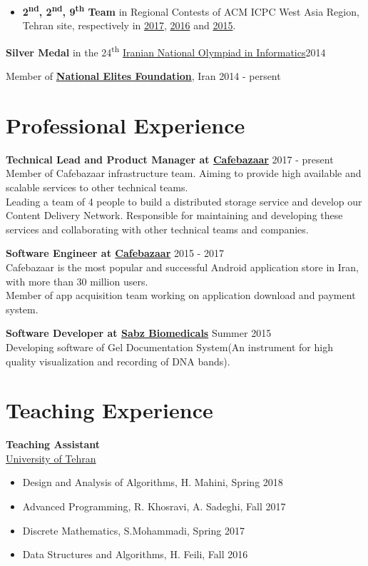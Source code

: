 \documentclass[margin]{res}
\begin{document}
\begin{resume}
\begin{itemize}
	\item {\bf 2\textsuperscript{nd}, 2\textsuperscript{nd}, 9\textsuperscript{th} Team} in Regional Contests of ACM ICPC West Asia Region,
	Tehran site, respectively in 
	\href{http://icpc.sharif.edu/acmicpc17/scoreboard/}{2017}, 
	\href{http://icpc.sharif.edu/acmicpc16/scoreboard/}{2016} and 
	\href{http://icpc.sharif.edu/acmicpc15/scoreboard/}{2015}.

    \end{itemize}

    {\bf Silver Medal} in the 24\textsuperscript{th} \href{http://inoi.ir/}{Iranian National Olympiad in Informatics}\hfill 2014

    Member of \href{https://www.bmn.ir/}{{\bf National Elites Foundation}}, Iran \hfill 2014 - persent

\section{Professional Experience}
    {\bf Technical Lead and Product Manager at \href{https://cafebazaar.ir/}{Cafebazaar}} \hfill 2017 - present
    \\ Member of Cafebazaar infrastructure team. Aiming to provide high available and scalable services to other technical teams. 
    \\Leading a team of 4 people to build a distributed storage service and develop our Content Delivery Network. Responsible for maintaining and developing these services and collaborating with other technical teams and companies.
    
    {\bf Software Engineer at \href{https://cafebazaar.ir/}{Cafebazaar}} \hfill 2015 - 2017
    \\ Cafebazaar is the most popular and successful Android application store in Iran, with more than 30 million users.
    \\ Member of app acquisition team working on application download and payment system.
    
    {\bf Software Developer at \href{http://www.sabzgroup.com/}{Sabz Biomedicals}} \hfill Summer 2015
    \\Developing software of Gel Documentation System(An instrument for  high quality visualization and recording of DNA bands).

\section{Teaching Experience}
	{\bf Teaching Assistant}
	\\\href{http://ut.ac.ir/en}{University of Tehran}
	\begin{itemize}
		\item Design and Analysis of Algorithms, H. Mahini, Spring 2018
		\item Advanced Programming, R. Khosravi, A. Sadeghi, Fall 2017
		\item Discrete Mathematics, S.Mohammadi, Spring 2017
		\item Data Structures and Algorithms, H. Feili, Fall 2016
	\end{itemize}


\end{resume}
\end{document}
